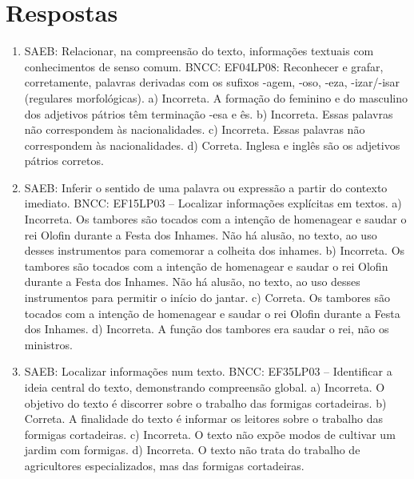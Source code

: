 \chapter{Respostas}
\pagestyle{plain}
\footnotesize

\pagecolor{gray!40}


\begin{enumerate}
\item
SAEB: Relacionar, na compreensão do texto, informações textuais
com conhecimentos de senso comum.
BNCC: EF04LP08: Reconhecer e grafar, corretamente, palavras derivadas
com os sufixos -agem, -oso, -eza, -izar/-isar (regulares morfológicas).
a) Incorreta. A formação do feminino e do masculino dos adjetivos
pátrios têm terminação -esa e ês.
b) Incorreta. Essas palavras não correspondem às nacionalidades.
c) Incorreta. Essas palavras não correspondem às nacionalidades.
d) Correta. Inglesa e inglês são os adjetivos pátrios corretos.

\item
SAEB: Inferir o sentido de uma palavra ou expressão a partir do
contexto imediato.
BNCC: EF15LP03 -- Localizar informações explícitas em textos.
a) Incorreta. Os tambores são tocados com a intenção de homenagear e
saudar o rei Olofin durante a Festa dos Inhames. Não há alusão, no texto, ao uso desses instrumentos para comemorar a colheita dos inhames.
b) Incorreta. Os tambores são tocados com a intenção de homenagear e
saudar o rei Olofin durante a Festa dos Inhames. Não há alusão, no texto, ao uso desses instrumentos para permitir o início do jantar.
c) Correta. Os tambores são tocados com a intenção de homenagear e
saudar o rei Olofin durante a Festa dos Inhames.
d) Incorreta. A função dos tambores era saudar o rei, não os ministros.

\item
SAEB: Localizar informações num texto.
BNCC: EF35LP03 -- Identificar a ideia central do texto, demonstrando
compreensão global.
a) Incorreta. O objetivo do texto é discorrer sobre o trabalho das
formigas cortadeiras.
b) Correta. A finalidade do texto é informar os leitores sobre o
trabalho das formigas cortadeiras.
c) Incorreta. O texto não expõe modos de cultivar um jardim com formigas.
d) Incorreta. O texto não trata do trabalho de agricultores 
especializados, mas das formigas cortadeiras.
\end{enumerate}


